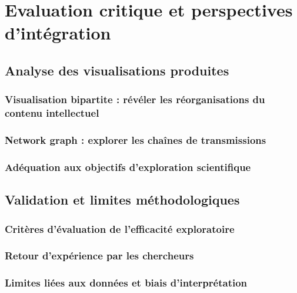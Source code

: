 \documentclass[a4paper,12pt,twoside]{book}
\newcommand{\clearemptydoublepage}{\newpage{\pagestyle{empty}\cleardoublepage}}
\begin{document}
	\clearemptydoublepage
	
	\part{Evaluation critique et perspectives d'intégration}
	\chapter{Analyse des visualisations produites}
	\section{Visualisation bipartite : révéler les réorganisations du contenu intellectuel}
	
	
	\section{Network graph : explorer les chaînes de transmissions}
	
	
	\section{Adéquation aux objectifs d'exploration scientifique}
	
	
	\clearemptydoublepage
	
	\chapter{Validation et limites méthodologiques}
	\section{Critères d'évaluation de l'efficacité exploratoire}
	
	
	\section{Retour d'expérience par les chercheurs}
	
	
	\section{Limites liées aux données et biais d'interprétation}
	
	
	\clearemptydoublepage
	
\end{document}

